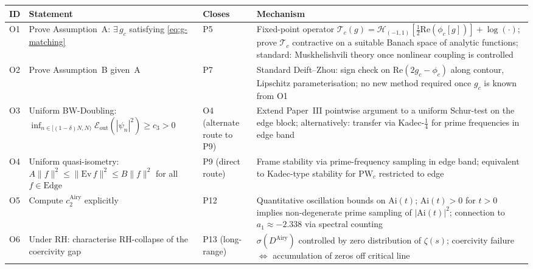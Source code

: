 \documentclass[12pt,a4paper]{amsart}
\theoremstyle{definition}
\begin{document}
\begin{center}
\renewcommand{\arraystretch}{1.35}
\begin{tabular}{l p{3.8cm} l p{4.5cm}}
\toprule
\textbf{ID} & \textbf{Statement} & \textbf{Closes} & \textbf{Mechanism} \\
\midrule
O1 & Prove Assumption~A:
    $\exists\,g_c$ satisfying
    \eqref{eq:g-matching}
    & P5
    & Fixed-point operator
      $\mathcal{T}_c(g)
      = \mathcal{H}_{(-1,1)}
      [\tfrac{1}{2}\mathrm{Re}(\phi_c[g])]
      + \log(\cdot)$;
      prove $\mathcal{T}_c$ contractive
      on a suitable Banach space
      of analytic functions;
      standard: Muskhelishvili theory
      once nonlinear coupling is
      controlled \\
O2 & Prove Assumption~B
    given~A
    & P7
    & Standard Deift--Zhou:
      sign check on $\mathrm{Re}(2g_c-\phi_c)$
      along contour, Lipschitz
      parameterisation;
      no new method required
      once $g_c$ is known from O1 \\
O3 & Uniform BW-Doubling:
    $\inf_{n\in[(1-\delta)N,N)}
    \mathcal{E}_{\mathrm{out}}(|\psi_n|^2)
    \ge c_3 > 0$
    & O4 (alternate route to P9)
    & Extend Paper~III pointwise
      argument to a uniform
      Schur-test on the edge block;
      alternatively: transfer
      via Kadec-$\tfrac{1}{4}$ for
      prime frequencies in edge band \\
O4 & Uniform quasi-isometry:
    $A\|f\|^2\le\|\mathrm{Ev}\,f\|^2
    \le B\|f\|^2$ for all
    $f\in\mathrm{Edge}$
    & P9 (direct route)
    & Frame stability via
      prime-frequency sampling
      in edge band;
      equivalent to Kadec-type
      stability for $\mathrm{PW}_c$
      restricted to edge \\
O5 & Compute $c_2^{\mathrm{Airy}}$
    explicitly
    & P12
    & Quantitative oscillation
      bounds on $\mathrm{Ai}(t)$;
      $\mathrm{Ai}(t)>0$ for $t>0$
      implies non-degenerate
      prime sampling of
      $|\mathrm{Ai}(t)|^2$;
      connection to $a_1\approx-2.338$
      via spectral counting \\
O6 & Under RH: characterise
    RH-collapse of the
    coercivity gap
    & P13 (long-range)
    & $\sigma(D^{\mathrm{Airy}})$
      controlled by zero distribution
      of $\zeta(s)$; coercivity
      failure $\Leftrightarrow$
      accumulation of zeros off
      critical line \\
\bottomrule
\end{tabular}
\end{center}
\end{document}
